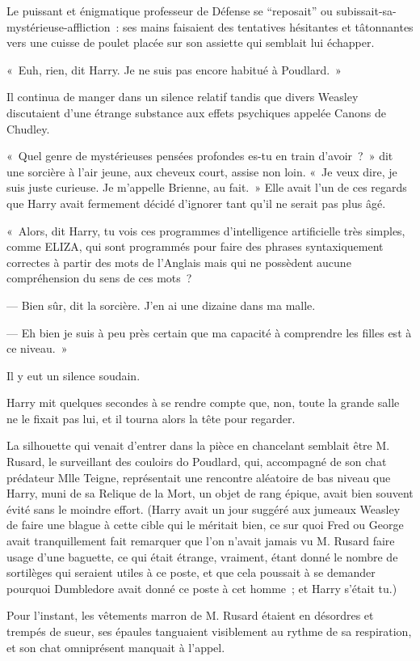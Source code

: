 Le puissant et énigmatique professeur de Défense se “reposait” ou subissait-sa-mystérieuse-affliction~: ses mains faisaient des tentatives hésitantes et tâtonnantes vers une cuisse de poulet placée sur son assiette qui semblait lui échapper.

«~Euh, rien, dit Harry.
Je ne suis pas encore habitué à Poudlard.~»

Il continua de manger dans un silence relatif tandis que divers Weasley discutaient d'une étrange substance aux effets psychiques appelée Canons de Chudley.

«~Quel genre de mystérieuses pensées profondes es-tu en train d'avoir~?~»
dit une sorcière à l'air jeune, aux cheveux court, assise non loin.
«~Je veux dire, je suis juste curieuse.
Je m'appelle Brienne, au fait.~»
Elle avait l'un de ces regards que Harry avait fermement décidé d'ignorer tant qu'il ne serait pas plus âgé.

«~Alors, dit Harry, tu vois ces programmes d'intelligence artificielle très simples, comme ELIZA, qui sont programmés pour faire des phrases syntaxiquement correctes à partir des mots de l'Anglais mais qui ne possèdent aucune compréhension du sens de ces mots~?

--- Bien sûr, dit la sorcière.
J'en ai une dizaine dans ma malle.

--- Eh bien je suis à peu près certain que ma capacité à comprendre les filles est à ce niveau.~»

Il y eut un silence soudain.

Harry mit quelques secondes à se rendre compte que, non, toute la grande salle ne le fixait pas lui, et il tourna alors la tête pour regarder.

La silhouette qui venait d'entrer dans la pièce en chancelant semblait être M. Rusard, le surveillant des couloirs do Poudlard, qui, accompagné de son chat prédateur Mlle Teigne, représentait une rencontre aléatoire de bas niveau que Harry, muni de sa Relique de la Mort, un objet de rang épique, avait bien souvent évité sans le moindre effort.
(Harry avait un jour suggéré aux jumeaux Weasley de faire une blague à cette cible qui le méritait bien, ce sur quoi Fred ou George avait tranquillement fait remarquer que l'on n'avait jamais vu M. Rusard faire usage d'une baguette, ce qui était étrange, vraiment, étant donné le nombre de sortilèges qui seraient utiles à ce poste, et que cela poussait à se demander pourquoi Dumbledore avait donné ce poste à cet homme~; et Harry s'était tu.)

Pour l'instant, les vêtements marron de M. Rusard étaient en désordres et trempés de sueur, ses épaules tanguaient visiblement au rythme de sa respiration, et son chat omniprésent manquait à l'appel.

